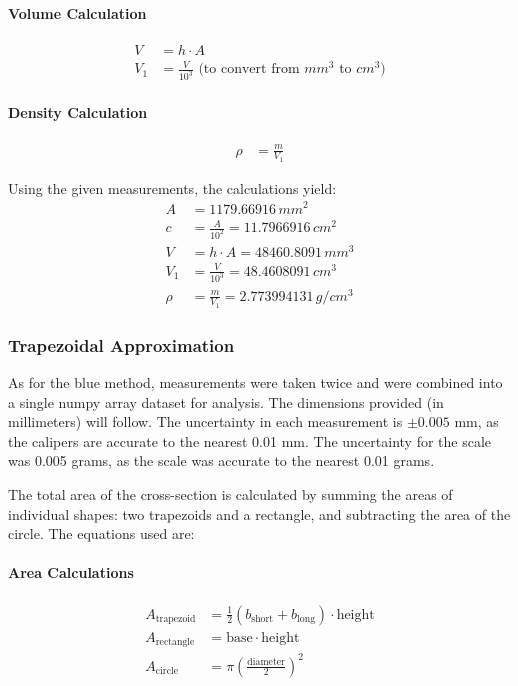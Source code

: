 \documentclass{article}
\begin{document}
\paragraph{Volume Calculation}
\begin{align*}
V &= h \cdot A \\
V_1 &= \frac{V}{10^3} \text{ (to convert from } mm^3 \text{ to } cm^3 \text{)}
\end{align*}

\paragraph{Density Calculation}
\begin{align*}
\rho &= \frac{m}{V_1}
\end{align*}

Using the given measurements, the calculations yield:
\begin{align*}
A &= 1179.66916 \, mm^2 \\
c &= \frac{A}{10^2} = 11.7966916 \, cm^2 \\
V &= h \cdot A = 48460.8091 \, mm^3 \\
V_1 &= \frac{V}{10^3} = 48.4608091 \, cm^3 \\
\rho &= \frac{m}{V_1} = 2.773994131 \, g/cm^3
\end{align*}

\subsubsection{Trapezoidal Approximation}
As for the blue method, measurements were taken twice and were combined into a single numpy array dataset for analysis. The dimensions provided (in millimeters) will follow. The uncertainty in each measurement is \(\pm 0.005\) mm, as the calipers are accurate to the nearest 0.01 mm. The uncertainty for the scale was 0.005 grams, as the scale was accurate to the nearest 0.01 grams.

The total area of the cross-section is calculated by summing the areas of individual shapes: two trapezoids and a rectangle, and subtracting the area of the circle. The equations used are:

\paragraph{Area Calculations}
\begin{align*}
A_{\text{trapezoid}} &= \frac{1}{2} (b_{\text{short}} + b_{\text{long}}) \cdot \text{height} \\
A_{\text{rectangle}} &= \text{base} \cdot \text{height} \\
A_{\text{circle}} &= \pi \left(\frac{\text{diameter}}{2}\right)^2
\end{align*}
\end{document}
